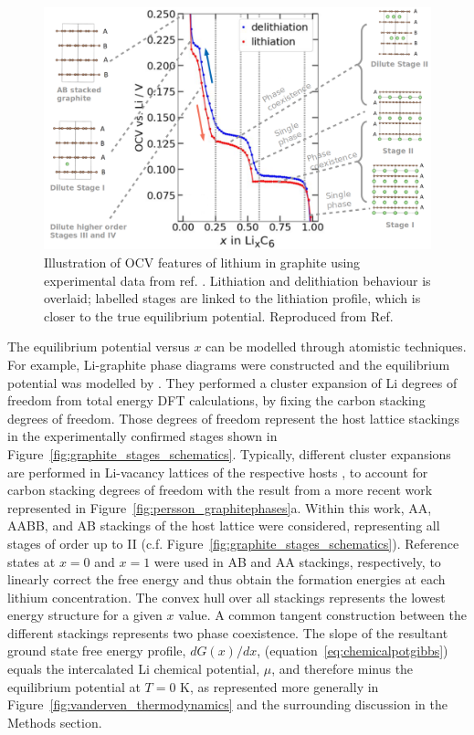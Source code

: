 \documentclass[../main.tex]{subfiles}
\begin{document}
    \begin{figure}
    \centering
    \includegraphics[scale=1.2]{figures/ocv_and_stages.png}
    \caption{Illustration of OCV features of lithium in graphite using experimental data from ref. . Lithiation and delithiation behaviour is overlaid; labelled stages are linked to the lithiation profile, which is closer to the true equilibrium potential. Reproduced from Ref. }
    \label{fig:expt_ocv}
\end{figure}

The equilibrium potential versus $x$ can be modelled through atomistic techniques. For example, Li-graphite phase diagrams were constructed and the equilibrium potential was modelled by \citeauthor{persson2010} \cite{persson2010}. They performed a cluster expansion of Li degrees of freedom from total energy DFT calculations, by fixing the carbon stacking degrees of freedom. Those degrees of freedom represent the host lattice stackings in the experimentally confirmed stages shown in Figure~\ref{fig:graphite_stages_schematics}. Typically, different cluster expansions are performed in Li-vacancy lattices of the respective hosts \cite{persson2010,hazrati_li_2014,Mercer2021}, to account for carbon stacking degrees of freedom with the result from a more recent work \cite{Mercer2021} represented in Figure~\ref{fig:persson_graphitephases}a. Within this work, AA, AABB, and AB stackings of the host lattice were considered, representing all stages of order up to II (c.f. Figure~\ref{fig:graphite_stages_schematics}). Reference states at $x=0$ and $x=1$ were used in AB and AA stackings, respectively, to linearly correct the free energy and thus obtain the formation energies at each lithium concentration. The convex hull over all stackings represents the lowest energy structure for a given $x$ value. A common tangent construction between the different stackings represents two phase coexistence. The slope of the resultant ground state free energy profile, $dG(x)/dx$, (equation~\ref{eq:chemicalpotgibbs}) equals the intercalated Li chemical potential, $\mu$, and therefore minus the equilibrium potential at $T=0$ K, as represented more generally in Figure~\ref{fig:vanderven_thermodynamics} and the surrounding discussion in the Methods section. 
\end{document}
